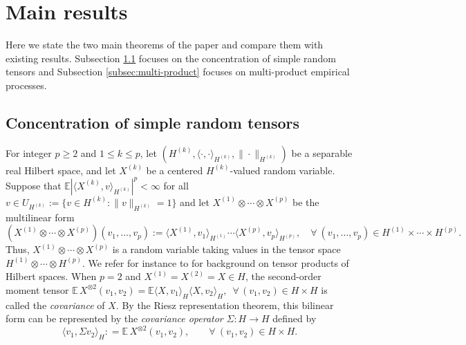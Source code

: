 \documentclass[numbers,webpdf,imaiai]{ima-authoring-template}
\theoremstyle{thmstyletwo}%
\numberwithin{equation}{section}
\numberwithin{equation}{section}
\newcommand{\E}{\mathbb{E}}
\begin{document}
\section{Main results}\label{sec:main}
Here we state the two main theorems of the paper and compare them with existing results. 
Subsection \ref{subsec:cencentraion_of_tensor} focuses on the concentration of simple random tensors and
Subsection \ref{subsec:multi-product} focuses on multi-product empirical processes. 


\subsection{Concentration of simple random tensors}\label{subsec:cencentraion_of_tensor}


For integer $p\ge 2$ and $1\le k\le p$, let $(H^{(k)}, \langle \cdot, \cdot\rangle_{H^{(k)}}, \| \cdot \|_{H^{(k)}})$ be a separable real Hilbert space, and let $X^{(k)}$ be a centered $H^{(k)}$-valued random variable. Suppose that $\E|\langle X^{(k)}, v \rangle_{H^{(k)}}|^p < \infty$ for all $v \in U_{H^{(k)}}:= \{v \in H^{(k)} : \|v\|_{H^{(k)}} = 1 \}$ and let  $X^{(1)} \otimes \cdots \otimes X^{(p)}$ be the multilinear form
\begin{equation*}
(X^{(1)} \otimes \cdots \otimes X^{(p)}) (v_1, \ldots, v_p) := \langle X^{(1)},v_1 \rangle_{H^{(1)}} \cdots \langle X^{(p)}, v_p \rangle_{H^{(p)}}, \quad \forall \ (v_1, \ldots, v_p) \in H^{(1)} \times \cdots \times H^{(p)}.
\end{equation*}
Thus, $X^{(1)} \otimes \cdots \otimes X^{(p)}$ is a random variable taking values in the tensor space $H^{(1)}\otimes \cdots \otimes H^{(p)}$. We refer for instance to \cite[Section II.4]{reed1980methods} for background on tensor products of Hilbert spaces. When $p=2$ and $X^{(1)}=X^{(2)}=X\in H$, the second-order moment tensor $\E\, X^{\otimes 2}(v_1,v_2) = \E \langle X, v_1\rangle_H \langle X,v_2\rangle_H,$  $\, \forall\, (v_1, v_2) \in H \times H $ is called the \emph{covariance} of $X.$ By the Riesz representation theorem, this bilinear form can be represented by the \emph{covariance operator} $\Sigma: H \to H$ defined by 
$$ \langle v_1, \Sigma v_2 \rangle_H : =  \E \,X^{\otimes 2}(v_1,v_2), \qquad    \forall \ (v_1,v_2) \in H \times H.$$
\end{document}
